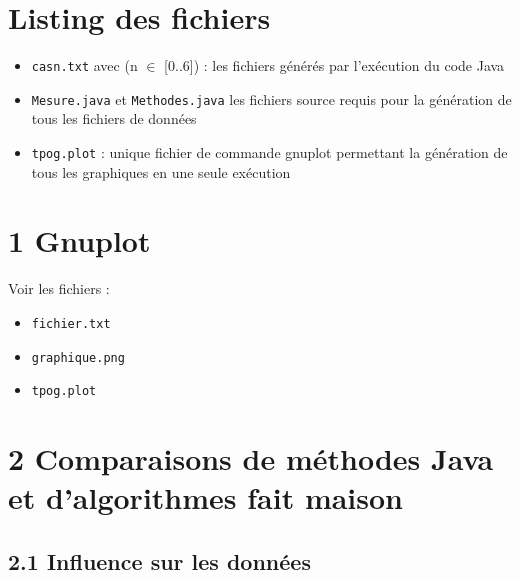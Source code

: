 \section*{Listing des fichiers}
\begin{itemize}
	\item \verb+casn.txt+ avec (n $\in$ [0..6]) : les fichiers générés par l'exécution du code Java
	\item \verb+Mesure.java+ et \verb+Methodes.java+ les fichiers source requis pour la génération de tous les fichiers de données
	\item \verb+tpog.plot+ : unique fichier de commande gnuplot permettant la génération de tous les graphiques en une seule exécution
\end{itemize}

\section*{1 Gnuplot}

Voir les fichiers :
\begin{itemize}
	\item \verb+fichier.txt+
	\item \verb+graphique.png+
	\item \verb+tpog.plot+
\end{itemize}

\section*{2 Comparaisons de méthodes Java et d'algorithmes fait maison}

\subsection*{2.1 Influence sur les données}
~\\

